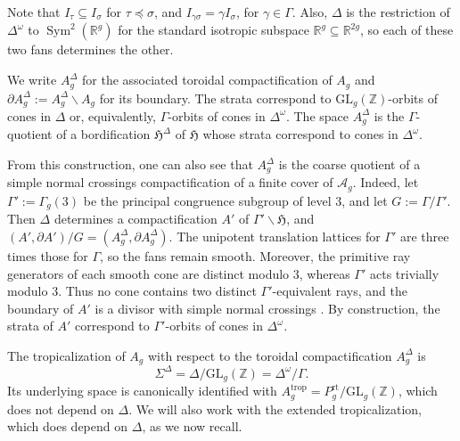\documentclass[12 pt]{amsart}
\newcommand{\fH}{\mathfrak H}
\newcommand{\RR}{\mathbb{R}}
\newcommand{\ZZ}{\mathbb{Z}}
\newcommand{\cA}{\mathcal{A}}
\newcommand{\Sym}{\operatorname{Sym}}
\newcommand{\GL}{\mathrm{GL}}
\newcommand{\rt}{\mathrm{rt}}
\newcommand{\trop}{\mathrm{trop}}
\newcommand{\<}{\langle}
\renewcommand{\>}{\rangle}
\theoremstyle{definition}
\begin{document}
\noindent Note that $I_\tau \subseteq I_\sigma$ for $\tau \preceq \sigma$, and $I_{\gamma \sigma} = \gamma I_\sigma$, for $\gamma \in \Gamma$. Also, $\Delta$ is the restriction of $\Delta^\omega$ to $\Sym^2(\RR^g)$ for the standard isotropic subspace $\RR^g \subseteq \RR^{2g}$, so each of these two fans determines the other.

We write $A_g^\Delta$ for the associated toroidal compactification of $A_g$ and $\partial A_g^\Delta := A_g^\Delta \smallsetminus A_g$ for its boundary. The strata correspond to $\GL_g(\ZZ)$-orbits of cones in $\Delta$ or, equivalently, $\Gamma$-orbits of cones in $\Delta^\omega$.  The space $A_g^\Delta$ is the $\Gamma$-quotient of a bordification $\fH^\Delta$ of $\fH$ whose strata correspond to cones in $\Delta^\omega$. 

From this construction, one can also see that $A_g^\Delta$ is the coarse quotient of a simple normal crossings compactification of a finite cover of $\cA_g$.  Indeed, let $\Gamma' := \Gamma_g(3)$ be the principal congruence subgroup of level 3, and let $G := \Gamma/\Gamma'$. Then $\Delta$ determines a  compactification $A'$ of $\Gamma' \backslash \fH$, and $(A', \partial A')/G = (A_g^\Delta, \partial A_g^\Delta)$. The unipotent translation lattices for $\Gamma'$ are three times those for $\Gamma$, so the fans remain smooth. Moreover, the primitive ray generators of each smooth cone are distinct modulo $3$, whereas $\Gamma'$ acts trivially modulo $3$. Thus no cone contains two distinct $\Gamma'$-equivalent rays, and the boundary of $A'$ is a divisor with simple normal crossings \cite[Proposition~A.3]{MaSiegelOperators}. By construction, the strata of $A'$ correspond to $\Gamma'$-orbits of cones in $\Delta^\omega$.

The tropicalization of $A_g$ with respect to the toroidal compactification $A_g^\Delta$ is 
\[
\Sigma^\Delta = \Delta/\GL_g(\ZZ) = \Delta^\omega/\Gamma.
\]
Its underlying space is canonically identified with $A_g^\trop=P_g^\rt/\GL_g(\ZZ)$, which does not depend on $\Delta$. We will also work with the extended tropicalization, which does depend on $\Delta$, as we now recall.
\end{document}
